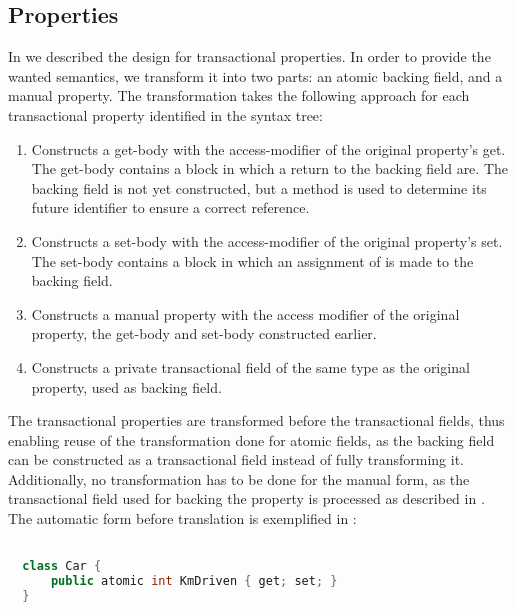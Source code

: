 \subsection{Properties}\label{sec:roslyn_extension_properties}
In  we described the design for transactional properties. In order to provide the wanted semantics, we transform it into two parts: an atomic backing field, and a manual property. The transformation takes the following approach for each transactional property identified in the syntax tree:

\begin{enumerate}
	\item Constructs a get-body with the access-modifier of the original property's get. The get-body contains a block in which a return to the backing field are. The backing field is not yet constructed, but a method is used to determine its future identifier to ensure a correct reference.
	\item Constructs a set-body with the access-modifier of the original property's set. The set-body contains a block in which an assignment of  is made to the backing field.
	\item Constructs a manual property with the access modifier of the original property, the get-body and set-body constructed earlier.
	\item Constructs a private transactional field of the same type as the original property, used as backing field.
\end{enumerate}

The transactional properties are transformed before the transactional fields, thus enabling reuse of the transformation done for atomic fields, as the backing field can be constructed as a transactional field instead of fully transforming it. Additionally, no transformation has to be done for the manual form, as the transactional field used for backing the property is processed as described in . The automatic form before translation is exemplified in :

\begin{lstlisting}[label=lst:before_atomic_property,
  caption={Before Transformation},
  language=Java,  
  showspaces=false,
  showtabs=false,
  breaklines=true,
  showstringspaces=false,
  breakatwhitespace=true,
  commentstyle=\color{greencomments},
  keywordstyle=\color{bluekeywords},
  stringstyle=\color{redstrings},
  morekeywords={atomic, retry, orElse, var, get, set, string}]  % Start your code-block

  class Car {
      public atomic int KmDriven { get; set; }
  }
\end{lstlisting}

